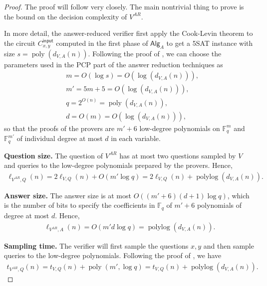 \documentclass[11pt]{article}
\theoremstyle{plain}
\theoremstyle{definition}
\newcommand{\poly} {\ensuremath{\operatorname{poly}}}
\newcommand{\polylog} {\ensuremath{\operatorname{polylog}}}
\newcommand{\1}{\mathbb{1}} %
\newcommand{\bF}{\mathbb{F}}
\newcommand{\ipt}{\mathsf{input}}
\newcommand{\Alg}{\mathsf{Alg}}
\begin{document}
\begin{proof}
    The proof will follow \cite{10.1145/3564246.3585208} very closely. The main nontrivial thing to prove is the bound on the decision complexity of $V^{AR}$. 
    
    In more detail, the answer-reduced verifier first apply the Cook-Levin theorem to the circuit $C^{\ipt}_{x,y}$ computed in the first phase of $\Alg_A$ to
    get a 5SAT instance with size $s = \poly(d_{V,A}(n))$.
    Following the proof of \cite[Theorem 51]{10.1145/3564246.3585208}, we can choose the parameters used in the PCP part of the answer reduction techniques as
    \begin{align*}
        &m = O(\log s) = O(\log(d_{V,A}(n))),\\
        &m' = 5m + 5 = O(\log(d_{V,A}(n))),\\
        &q = 2^{O(n)} = \poly(d_{V,A}(n)),\\
        &d = O(m) = O(\log(d_{V,A}(n))),
    \end{align*}
    so that the proofs of the provers are $m'+6$ low-degree polynomials on $\bF_q^m$ and $\bF_q^{m'}$ of individual degree at most $d$ in each variable.

    \textbf{Question size.} The question of $V^{AR}$ has at most two questions sampled by $V$ and queries to the low-degree polynomials prepared by the provers. Hence, 
    \begin{align*}
        \ell_{V^{AR},Q}(n) = 2 \ell_{V,Q}(n) + O(m' \log q) = 2 \ell_{V,Q}(n) + \polylog(d_{V,A}(n)).
    \end{align*}

    \textbf{Answer size.} The answer size is at most $O((m'+6)(d+1)\log q)$, which is the number of bits to specify the coefficients in $\bF_q$ of $m'+6$ polynomials of degree at most $d$. Hence,
    \begin{align*}
        \ell_{V^{AR},A}(n) = O(m'd \log q) = \polylog(d_{V,A}(n)).
    \end{align*}

    \textbf{Sampling time.} The verifier will first sample the questions $x,y$ and then sample queries to the low-degree polynomials. Following the proof of \cite[Theorem 10.27]{JNVWY'20}, we have
    \begin{align*}
        t_{V^{AR}, Q}(n) = t_{V,Q}(n) + \poly(m',\log q) = t_{V,Q}(n) + \polylog(d_{V,A}(n)).
    \end{align*}


\end{proof}
\end{document}
